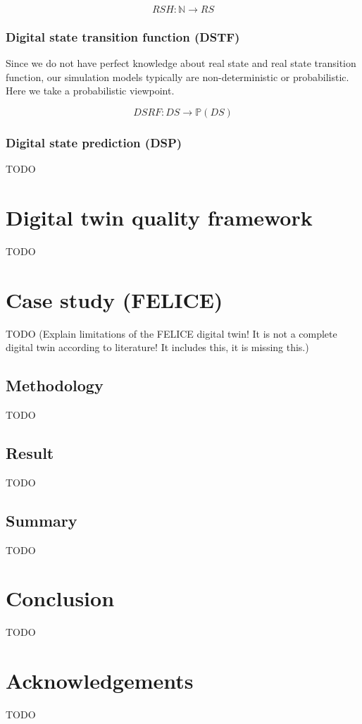 \documentclass[conference]{IEEEtran}
\begin{document}
    \[
        RSH: \mathbb{N} \rightarrow RS
    \]

    \subsubsection{Digital state transition function (DSTF)}

    Since we do not have perfect knowledge about real state and real state transition function, our simulation models typically are non-deterministic or probabilistic.
    Here we take a probabilistic viewpoint.

    \[
        DSRF: DS \rightarrow \mathbb{P}(DS)
    \]

    \subsubsection{Digital state prediction (DSP)}

    TODO

    \section{Digital twin quality framework}
    \label{section:framework_2}

    TODO

    \section{Case study (FELICE)}
    \label{section:case}

    TODO (Explain limitations of the FELICE digital twin! It is not a complete digital twin according to literature! It includes this, it is missing this.)

    \subsection{Methodology}
    \label{section:case_methodology}

    TODO

    \subsection{Result}
    \label{section:case_result}

    TODO

    \subsection{Summary}
    \label{section:case_summary}

    TODO

    \section{Conclusion}
    \label{section:conclusion}
    TODO

    \section*{Acknowledgements}
    TODO

    
    
\end{document}
